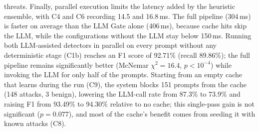 \documentclass[runningheads]{llncs}
\newif\ifrev
\newcommand{\rev}[1]{\ifrev\hl{#1}\else#1\fi}                  %
\begin{document}
threats. Finally, parallel execution limits the latency added by the
heuristic ensemble, with C4 and C6 recording \rev{14.5 and 16.8\,ms. The full pipeline (304\,ms) is faster on average than the LLM Gate alone (406\,ms), because cache hits skip the LLM, while the configurations without the LLM stay below 150\,ms}. \rev{Running both LLM-assisted detectors in parallel on every prompt without any deterministic stage (C1b) reaches an F1 score of 92.71\% (recall 89.86\%); the full pipeline remains significantly better (McNemar $\chi^2=16.4$, $p<10^{-4}$) while invoking the LLM for only half of the prompts. Starting from an empty cache that learns during the run (C9), the system blocks 151 prompts from the cache (148 attacks, 3 benign), lowering the LLM-call rate from 87.3\% to 73.9\% and raising F1 from 93.49\% to 94.30\% relative to no cache; this single-pass gain is not significant ($p=0.077$), and most of the cache's benefit comes from seeding it with known attacks (C8).}
\end{document}
